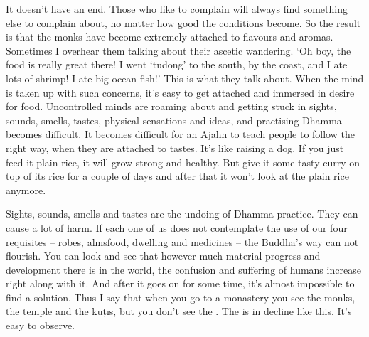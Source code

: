 It doesn't have an end. Those who like to complain will always find something else to complain about, no matter how good the conditions become. So the result is that the monks have become extremely attached to flavours and aromas. Sometimes I overhear them talking about their ascetic wandering. `Oh boy, the food is really great there! I went `tudong' to the south, by the coast, and I ate lots of shrimp! I ate big ocean fish!' This is what they talk about. When the mind is taken up with such concerns, it's easy to get attached and immersed in desire for food. Uncontrolled minds are roaming about and getting stuck in sights, sounds, smells, tastes, physical sensations and ideas, and practising Dhamma becomes difficult. It becomes difficult for an Ajahn to teach people to follow the right way, when they are attached to tastes. It's like raising a dog. If you just feed it plain rice, it will grow strong and healthy. But give it some tasty curry on top of its rice for a couple of days and after that it won't look at the plain rice anymore.

Sights, sounds, smells and tastes are the undoing of Dhamma practice. They can cause a lot of harm. If each one of us does not contemplate the use of our four requisites -- robes, almsfood, dwelling and medicines -- the Buddha's way can not flourish. You can look and see that however much material progress and development there is in the world, the confusion and suffering of humans increase right along with it. And after it goes on for some time, it's almost impossible to find a solution. Thus I say that when you go to a monastery you see the monks, the temple and the ku\d{t}\={\i}s, but you don't see the . The  is in decline like this. It's easy to observe.

